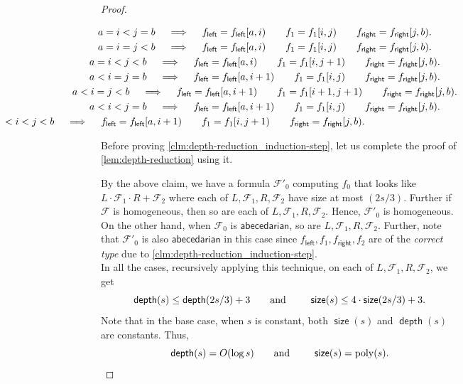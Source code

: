 \documentclass[10pt,a4paper]{article}
\def\poly{\operatorname{poly}}
\newcommand{\form}{\textbf{$\mathcal{F}$}}
\newcommand{\size}{\operatorname{\mathsf{size}}}
\newcommand{\depth}{\operatorname{\mathsf{depth}}}
\renewcommand{\l}{\mathsf{left}}
\renewcommand{\r}{\mathsf{right}}
\newcommand{\abcd}{\mathsf{abecedarian}}
\begin{document}
\begin{proof}
\begin{claim}
\begin{itemize}
\begin{itemize}
			\vspace{-2.5em}
			\begin{multline*}
				\hspace{-3em}
				a = i < j = b \quad \implies \quad f_\l = f_\l[a,i) \qquad f_1 = f_1[i,j) \qquad f_\r = f_\r[j,b).\\
				\hspace{-3em}
				a = i = j < b \quad \implies \quad f_\l = f_\l[a,i) \qquad f_1 = f_1[i,j) \qquad f_\r = f_\r[j,b).\\
				\hspace{-3em}
				a = i < j < b \quad \implies \quad f_\l = f_\l[a,i) \qquad f_1 = f_1[i,j+1) \qquad f_\r = f_\r[j,b).\\
				\hspace{-3em}
				a < i = j = b \quad \implies \quad f_\l = f_\l[a,i+1) \qquad f_1 = f_1[i,j) \qquad f_\r = f_\r[j,b).\\
				\hspace{-3em}
				a < i = j < b \quad \implies \quad f_\l = f_\l[a,i+1) \qquad f_1 = f_1[i+1,j+1) \qquad f_\r = f_\r[j,b).\\
				\hspace{-3em}
				a < i < j = b \quad \implies \quad f_\l = f_\l[a,i+1) \qquad f_1 = f_1[i,j) \qquad f_\r = f_\r[j,b).\\
				\hspace{-7cm}
				a < i < j < b \quad \implies \quad f_\l = f_\l[a,i+1) \qquad f_1 = f_1[i,j+1) \qquad f_\r = f_\r[j,b).
			\end{multline*}
		\end{itemize}
	\end{itemize} 
\end{claim}

\noindent Before proving \autoref{clm:depth-reduction_induction-step}, let us complete the proof of \autoref{lem:depth-reduction} using it.

By the above claim, we have a formula $\form'_0$ computing  $f_0$ that looks like $L \cdot \form_1 \cdot R + \form_2$ where each of $L, \form_1, R, \form_2$ have size at most $(2s/3)$. 
Further if $\form$ is homogeneous, then so are each of $L, \form_1, R, \form_2$.
Hence, $\form'_0$ is homogeneous.
On the other hand, when $\form_0$ is $\abcd$, so are $L, \form_1, R, \form_2$. 
Further, note that $\form'_0$ is also $\abcd$ in this case since $f_\l, f_1, f_\r, f_2$ are of the \emph{correct type} due to \autoref{clm:depth-reduction_induction-step}.\\ 
%
%
%
%

\noindent In all the cases, recursively applying this technique, on each of $L, \form_1, R, \form_2$, we get
\[
	\depth(s) \leq \depth(2s/3) + 3 \text{\qquad and \qquad} \size(s) \leq 4 \cdot \size(2s/3) + 3.
\]
Note that in the base case, when $s$ is constant, both $\size(s)$ and $\depth(s)$ are constants. Thus,
\[
	\depth(s) = O(\log s) \text{\qquad and \qquad} \size(s) = \poly(s). \qedhere
\]
\end{proof}
\end{document}
